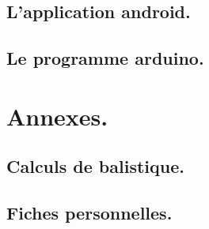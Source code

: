 \documentclass{report}
\begin{document}
\chapter{L'application android.}


\chapter{Le programme arduino.}
% 

\part{Annexes.}
\appendix

\chapter{Calculs de balistique.}
% 

\chapter{Fiches personnelles.}

\newpage
\listoffigures
{}
\end{document}
